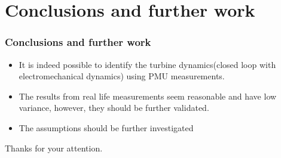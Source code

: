 \section{Conclusions and further work}
\begin{frame}
		\frametitle{Conclusions and further work}
	\begin{itemize}
		\item It is indeed possible to identify the turbine dynamics(closed loop with electromechanical dynamics) using PMU measurements.
		\item The results from real life measurements seem reasonable and have low variance, however, they should be further validated.
		\item The assumptions should be further investigated
	\end{itemize}
\end{frame}
\begin{frame}
		\begin{center}
		\Huge	Thanks for your attention.
\end{center}
\end{frame}

